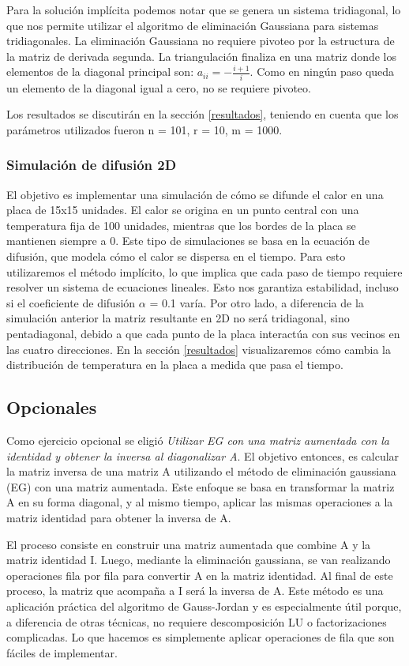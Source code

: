 Para la solución implícita podemos notar que se genera un sistema tridiagonal, lo que nos permite utilizar el algoritmo de eliminación Gaussiana para sistemas tridiagonales. La eliminación Gaussiana no requiere pivoteo por la estructura de la matriz de derivada segunda. La triangulación finaliza en una matriz donde los elementos de la diagonal principal son: $a_{ii} = - \frac{i+1}{i}$. 
Como en ningún paso queda un elemento de la diagonal igual a cero, no se requiere pivoteo.\par
Los resultados se discutirán en la sección \ref{resultados}, teniendo en cuenta que los parámetros utilizados fueron n = 101, r = 10, m = 1000.


\subsubsection{Simulación de difusión 2D}
 El objetivo es implementar una simulación de cómo se difunde el calor en una placa de 15x15 unidades. El calor se origina en un punto central con una temperatura fija de 100 unidades, mientras que los bordes de la placa se mantienen siempre a 0. Este tipo de simulaciones se basa en la ecuación de difusión, que modela cómo el calor se dispersa en el tiempo.
 Para esto utilizaremos el método implícito, lo que implica que cada paso de tiempo requiere resolver un sistema de ecuaciones lineales. Esto nos garantiza estabilidad, incluso si el coeficiente de difusión $\alpha$ = 0.1 varía.
Por otro lado, a diferencia de la simulación anterior la matriz resultante en 2D no será tridiagonal, sino pentadiagonal, debido a que cada punto de la placa interactúa con sus vecinos en las cuatro direcciones.
En la sección \ref{resultados} visualizaremos cómo cambia la distribución de temperatura en la placa a medida que pasa el tiempo.

\subsection{Opcionales}
\label{opcionales}

Como ejercicio opcional se eligió \textit{Utilizar EG con una matriz aumentada con la identidad y obtener la inversa al diagonalizar A}.
El objetivo entonces, es calcular la matriz inversa de una matriz A utilizando el método de eliminación gaussiana (EG) con una matriz aumentada. Este enfoque se basa en transformar la matriz A en su forma diagonal, y al mismo tiempo, aplicar las mismas operaciones a la matriz identidad para obtener la inversa de A.

El proceso consiste en construir una matriz aumentada que combine A y la matriz identidad I. Luego, mediante la eliminación gaussiana, se van realizando operaciones fila por fila para convertir A en la matriz identidad. Al final de este proceso, la matriz que acompaña a I será la inversa de A.
Este método es una aplicación práctica del algoritmo de Gauss-Jordan y es especialmente útil porque, a diferencia de otras técnicas, no requiere descomposición LU o factorizaciones complicadas. Lo que hacemos es simplemente aplicar operaciones de fila que son fáciles de implementar.